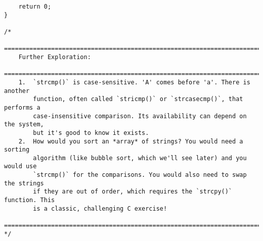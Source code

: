 \documentclass[11pt]{book}
\begin{document}
\begin{verbatim}
    return 0;
}

/*
    ================================================================================
    Further Exploration:
    ================================================================================
    1.  `strcmp()` is case-sensitive. 'A' comes before 'a'. There is another
        function, often called `stricmp()` or `strcasecmp()`, that performs a
        case-insensitive comparison. Its availability can depend on the system,
        but it's good to know it exists.
    2.  How would you sort an *array* of strings? You would need a sorting
        algorithm (like bubble sort, which we'll see later) and you would use
        `strcmp()` for the comparisons. You would also need to swap the strings
        if they are out of order, which requires the `strcpy()` function. This
        is a classic, challenging C exercise!
    ================================================================================
*/

\end{verbatim}
\clearpage
\end{document}
